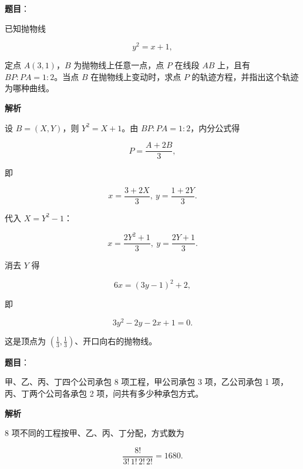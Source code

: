 \begin{answer}

\textbf{题目}：

已知抛物线

\nopagebreak[4]
\[
y^2=x+1,
\]

定点 $A(3,1)$，$B$ 为抛物线上任意一点，点 $P$ 在线段 $AB$ 上，且有 $BP:PA=1:2$。当点 $B$ 在抛物线上变动时，求点 $P$ 的轨迹方程，并指出这个轨迹为哪种曲线。

\textbf{解析}

设 $B=(X,Y)$，则 $Y^2=X+1$。由 $BP:PA=1:2$，内分公式得

\nopagebreak[4]
\[
P=\frac{A+2B}{3},
\]

即

\nopagebreak[4]
\[
x=\frac{3+2X}{3},\ y=\frac{1+2Y}{3}.
\]

代入 $X=Y^2-1$：

\nopagebreak[4]
\[
x=\frac{2Y^2+1}{3},\ y=\frac{2Y+1}{3}.
\]

消去 $Y$ 得

\nopagebreak[4]
\[
6x=(3y-1)^2+2,
\]

即

\nopagebreak[4]
\[
3y^2-2y-2x+1=0.
\]

这是顶点为 $\left(\frac13,\frac13\right)$、开口向右的抛物线。


\end{answer}
\begin{answer}

\textbf{题目}：

甲、乙、丙、丁四个公司承包 8 项工程，甲公司承包 3 项，乙公司承包 1 项，丙、丁两个公司各承包 2 项，问共有多少种承包方式。

\textbf{解析}

8 项不同的工程按甲、乙、丙、丁分配，方式数为

\nopagebreak[4]
\[
\frac{8!}{3!\,1!\,2!\,2!}=1680.
\]


\end{answer}
